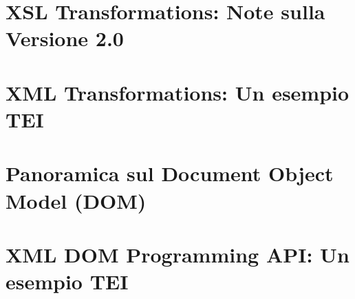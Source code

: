 \documentclass{beamer}
\begin{document}
        
    
            
        
    
    \section{XSL Transformations: Note sulla Versione 2.0}
    
    
    \section{XML Transformations: Un esempio TEI}
    
    
    \section{Panoramica sul Document Object Model (DOM)}
    
    
    \section{XML DOM Programming API: Un esempio TEI}
    
    
    
\end{document}
